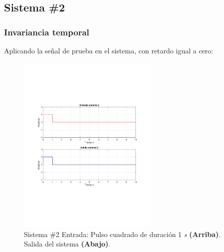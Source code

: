 		\subsection{Sistema \#2}
			\subsubsection{Invariancia temporal}
				Aplicando la señal de prueba en el sistema, con retardo igual a cero:
				\begin{figure}[H]
				\center
				\includegraphics[width=0.6\textwidth,clip, trim = {2cm 7.0cm 2.2cm 7.0cm}]{../imgs/sistema_2_invarianza_temporal_noretardo.pdf}
				\caption{Sistema \#2 Entrada: Pulso cuadrado de duración 1 \textit{s} \textbf{(Arriba)}. Salida del sistema \textbf{(Abajo)}.}
				\label{fig:s_2_time_invariant_test_1}
				\end{figure}
			
